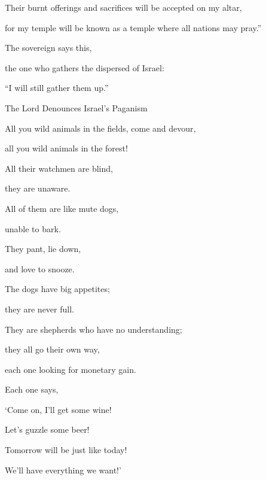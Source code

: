 {\par }{\Q Their burnt offerings
and sacrifices
will be accepted
on
my altar,
\par }{\Q for
my temple
will be known as a temple
where all
nations
may pray.”
\par }{\Q {}The sovereign
{}
says
this,
\par }{\Q the one who gathers
the dispersed
of Israel:
\par }{\Q “I will still
gather
them up.”
\par }{\SH The Lord Denounces Israel’s Paganism
\par }{\Q {}All
you wild animals
in the fields,
come
and devour,
\par }{\Q all
you wild animals
in the forest!
\par }{\Q {}All
their watchmen
are blind,
\par }{\Q they are unaware.
\par }{\Q All
of them are like mute
dogs,
\par }{\Q unable
to bark.
\par }{\Q They pant,
lie down,
\par }{\Q and love
to snooze.
\par }{\Q {}The dogs
have big appetites;
\par }{\Q they are never
full.
\par }{\Q They
are shepherds
who have no
understanding;
\par }{\Q they all
go their own way,
\par }{\Q each
one looking for monetary
gain.
\par }{\Q {}Each one says,

\par }{\Q ‘Come
on, I’ll get
some wine!
\par }{\Q Let’s guzzle
some beer!
\par }{\Q Tomorrow
will be
just like today!
\par }{\Q We’ll have everything we want!’

}
